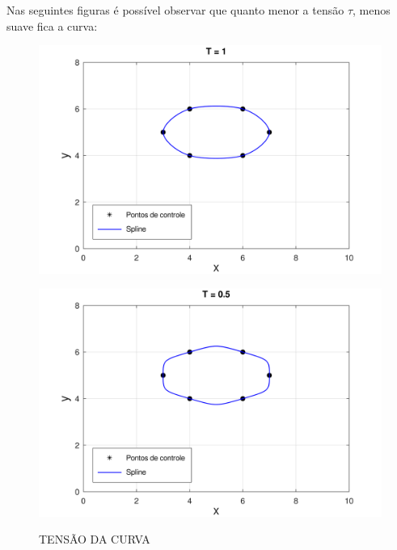 Nas seguintes figuras é possível observar que quanto menor a tensão $\tau$, menos suave fica a curva:

\begin{figure}[h!]
    \caption{TENSÃO DA CURVA}
    \centering
    \begin{minipage}[b]{0.45\textwidth}
        \centering
        \includegraphics[width=1\linewidth]{fig/cat_rom_t1.png}
        \label{fig:tesao1}
    \end{minipage}
    \hfill
    \begin{minipage}[b]{0.45\textwidth}
        \centering
        \includegraphics[width=1\linewidth]{fig/cat_rom_t05.png}
        \label{fig:tensao05}
    \end{minipage}

    \vspace{1cm}


\end{figure}
